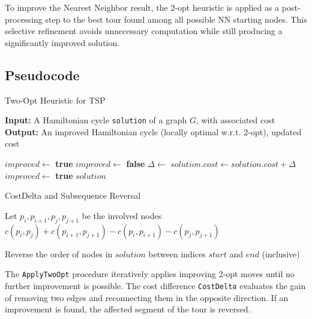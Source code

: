 To improve the Nearest Neighbor result, the 2-opt heuristic is applied as a post-processing step to the best tour found among all possible NN starting nodes. This selective refinement avoids unnecessary computation while still producing a significantly improved solution.

\subsection{Pseudocode}

\begin{algorithm}
\caption{Two-Opt Heuristic for TSP}
\label{alg:twoopt}
\textbf{Input:} A Hamiltonian cycle \texttt{solution} of a graph $G$, with associated cost\\
\textbf{Output:} An improved Hamiltonian cycle (locally optimal w.r.t. 2-opt), updated cost
\begin{algorithmic}
    \State $improved \gets$ \textbf{true}
        \State $improved \gets$ \textbf{false}
                \State $\Delta \gets$ 
                    \State {}
                    \State $solution.cost \gets solution.cost + \Delta$
                    \State $improved \gets$ \textbf{true}
                \EndIf
            \EndFor
        \EndFor
    \EndWhile
    \State \Return $solution$
\EndProcedure
\end{algorithmic}
\end{algorithm}

\begin{algorithm}
\caption{CostDelta and Subsequence Reversal}
\label{alg:subroutines}
\begin{algorithmic}
    \State Let $p_i, p_{i+1}, p_j, p_{j+1}$ be the involved nodes
    \State \Return $c(p_i, p_j) + c(p_{i+1}, p_{j+1}) - c(p_i, p_{i+1}) - c(p_j, p_{j+1})$
\EndFunction

    \State Reverse the order of nodes in $solution$ between indices $start$ and $end$ (inclusive)
\EndProcedure
\end{algorithmic}
\end{algorithm}

The \texttt{ApplyTwoOpt} procedure iteratively applies improving 2-opt moves until no further improvement is possible. 
The cost difference \texttt{CostDelta} evaluates the gain of removing two edges and reconnecting them in the opposite direction. 
If an improvement is found, the affected segment of the tour is reversed.

